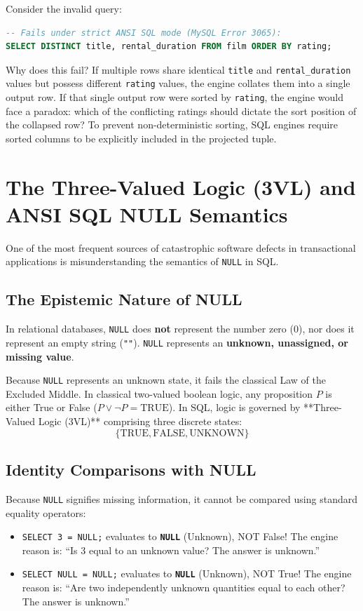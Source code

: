 \documentclass[10pt,journal,compsoc,onecolumn]{IEEEtran}
\begin{document}
Consider the invalid query:
\begin{lstlisting}[language=SQL]
-- Fails under strict ANSI SQL mode (MySQL Error 3065):
SELECT DISTINCT title, rental_duration FROM film ORDER BY rating;
\end{lstlisting}
Why does this fail? If multiple rows share identical \texttt{title} and \texttt{rental\_duration} values but possess different \texttt{rating} values, the engine collates them into a single output row. If that single output row were sorted by \texttt{rating}, the engine would face a paradox: which of the conflicting ratings should dictate the sort position of the collapsed row? To prevent non-deterministic sorting, SQL engines require sorted columns to be explicitly included in the projected tuple.

\section{The Three-Valued Logic (3VL) and ANSI SQL NULL Semantics}
\label{sec:three_valued_logic}

One of the most frequent sources of catastrophic software defects in transactional applications is misunderstanding the semantics of \texttt{NULL} in SQL.

\subsection{The Epistemic Nature of NULL}
In relational databases, \texttt{NULL} does \textbf{not} represent the number zero ($0$), nor does it represent an empty string (\texttt{""}). \texttt{NULL} represents an \textbf{unknown, unassigned, or missing value}.

Because \texttt{NULL} represents an unknown state, it fails the classical Law of the Excluded Middle. In classical two-valued boolean logic, any proposition $P$ is either True or False ($P \lor \neg P = \text{TRUE}$). In SQL, logic is governed by **Three-Valued Logic (3VL)** comprising three discrete states:
\begin{equation*}
\{ \text{TRUE}, \text{FALSE}, \text{UNKNOWN} \}
\end{equation*}

\subsection{Identity Comparisons with NULL}
Because \texttt{NULL} signifies missing information, it cannot be compared using standard equality operators:
\begin{itemize}
    \item \texttt{SELECT 3 = NULL;} evaluates to \textbf{\texttt{NULL}} (Unknown), NOT False! The engine reason is: ``Is 3 equal to an unknown value? The answer is unknown.''
    \item \texttt{SELECT NULL = NULL;} evaluates to \textbf{\texttt{NULL}} (Unknown), NOT True! The engine reason is: ``Are two independently unknown quantities equal to each other? The answer is unknown.''
\end{itemize}
\end{document}
